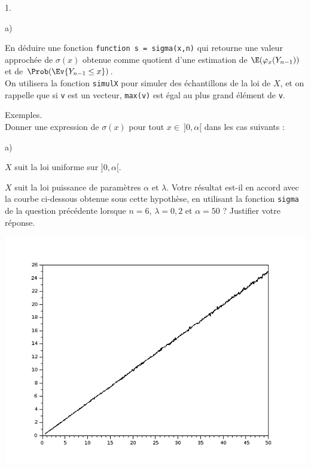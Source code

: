 \documentclass[11pt]{article}%
\begin{document}
\begin{noliste}{1.}
\begin{noliste}{a)}
    
    
    

    
    \item En déduire une fonction \Scilab{} {\tt function s = 
    sigma(x,n)} qui retourne une valeur approchée de $\sigma(x)$
    obtenue comme quotient d'une estimation de $\E(\varphi_x(Y_{n-1}))$
    et de $\Prob(\Ev{Y_{n-1} \leq x})$.\\
    On utilisera la fonction {\tt simulX} pour simuler des 
    échantillons de la loi de $X$, et on rappelle que si {\tt v} est 
    un vecteur, {\tt max(v)} est égal au plus grand élément de 
    {\tt v}.
    
    
  \end{noliste}
  
  
  
  
  \item Exemples.\\
  Donner une expression de $\sigma(x)$ pour tout $x \in \ ]0,\alpha[$
  dans les cas suivants : 
  \begin{noliste}{a)}
    \setlength{\itemsep}{2mm}
    \item $X$ suit la loi uniforme sur $]0,\alpha[$.
    
    

    
    \item $X$ suit la loi puissance de paramètres $\alpha$ et $\lambda$.
    Votre résultat est-il en accord avec la courbe ci-dessous 
    obtenue sous cette hypothèse, en utilisant la fonction {\tt sigma}
    de la question précédente lorsque $n=6$, $\lambda=0,2$ et 
    $\alpha = 50$ ? Justifier votre réponse.
    
    \begin{center}
      \includegraphics[scale=.5]
      {Figures/ESSEC-I_2018/Figure_ESSEC-I_2018.png}
    \end{center}
    
    
    
    
    
  \end{noliste}
\end{noliste}
\end{document}
